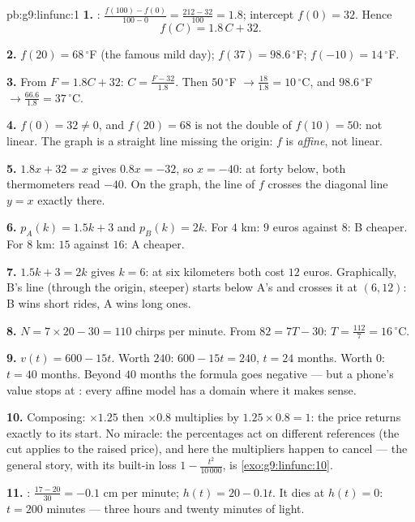 \begin{solution}{pb:g9:linfunc:1}
\textbf{1.} : $\frac{f(100) - f(0)}{100 - 0} =
\frac{212 - 32}{100} = 1.8$; intercept $f(0) = 32$. Hence
\[
f(C) = 1.8\,C + 32 .
\]

\textbf{2.} $f(20) = 68\,^\circ$F (the famous mild day);
$f(37) = 98.6\,^\circ$F; $f(-10) = 14\,^\circ$F.

\textbf{3.} From $F = 1.8C + 32$:
$C = \frac{F - 32}{1.8}$. Then $50\,^\circ$F
$\to \frac{18}{1.8} = 10\,^\circ$C, and $98.6\,^\circ$F
$\to \frac{66.6}{1.8} = 37\,^\circ$C.

\textbf{4.} $f(0) = 32 \neq 0$, and $f(20) = 68$ is not the
double of $f(10) = 50$: not linear. The graph is a straight
line missing the origin: $f$ is \emph{affine}, not linear.

\textbf{5.} $1.8x + 32 = x$ gives $0.8x = -32$, so $x = -40$:
at forty below, both thermometers read $-40$. On the graph, the
line of $f$ crosses the diagonal line $y = x$ exactly there.

\textbf{6.} $p_A(k) = 1.5k + 3$ and $p_B(k) = 2k$. For $4$ km:
$9$ euros against $8$: B cheaper. For $8$ km: $15$ against
$16$: A cheaper.

\textbf{7.} $1.5k + 3 = 2k$ gives $k = 6$: at six kilometers
both cost $12$ euros. Graphically, B's line (through the
origin, steeper) starts below A's and crosses it at
$(6, 12)$: B wins short rides, A wins long ones.

\textbf{8.} $N = 7 \times 20 - 30 = 110$ chirps per minute. From
$82 = 7T - 30$: $T = \frac{112}{7} = 16\,^\circ$C.

\textbf{9.} $v(t) = 600 - 15t$. Worth $240$:
$600 - 15t = 240$, $t = 24$ months. Worth $0$: $t = 40$ months.
Beyond $40$ months the formula goes negative --- but a phone's
value stops at : every affine model has a domain where it
makes sense.

\textbf{10.} Composing: $\times 1.25$ then $\times 0.8$
multiplies by $1.25 \times 0.8 = 1$: the price returns exactly
to its start. No miracle: the percentages act on different
references (the cut applies to the raised price), and here the
multipliers happen to cancel --- the general story, with its
built-in loss $1 - \frac{t^2}{10\,000}$, is
\cref{exo:g9:linfunc:10}.

\textbf{11.} : $\frac{17 - 20}{30} = -0.1$ cm per minute;
$h(t) = 20 - 0.1t$. It dies at $h(t) = 0$: $t = 200$ minutes
--- three hours and twenty minutes of light.


\end{solution}
